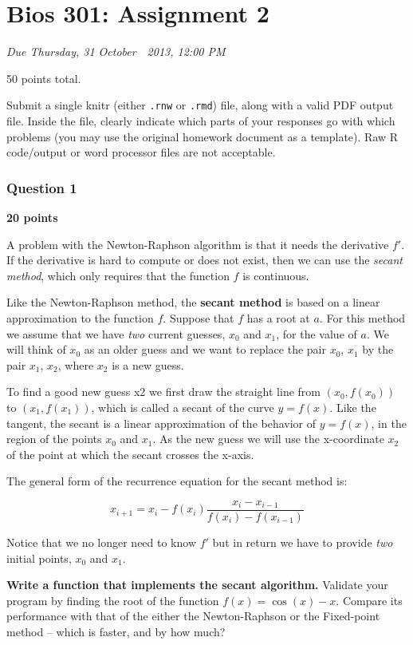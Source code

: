 \documentclass[]{article}
\author{}
\date{}
\begin{document}
\section{Bios 301: Assignment 2}

\emph{Due Thursday, 31 October 👻 2013, 12:00 PM}

50 points total.

Submit a single knitr (either \texttt{.rnw} or \texttt{.rmd}) file,
along with a valid PDF output file. Inside the file, clearly indicate
which parts of your responses go with which problems (you may use the
original homework document as a template). Raw R code/output or word
processor files are not acceptable.

\subsubsection{Question 1}

\textbf{20 points}

A problem with the Newton-Raphson algorithm is that it needs the
derivative $f′$. If the derivative is hard to compute or does not exist,
then we can use the \emph{secant method}, which only requires that the
function $f$ is continuous.

Like the Newton-Raphson method, the \textbf{secant method} is based on a
linear approximation to the function $f$. Suppose that $f$ has a root at
$a$. For this method we assume that we have \emph{two} current guesses,
$x_0$ and $x_1$, for the value of $a$. We will think of $x_0$ as an
older guess and we want to replace the pair $x_0$, $x_1$ by the pair
$x_1$, $x_2$, where $x_2$ is a new guess.

To find a good new guess x2 we first draw the straight line from
$(x_0,f(x_0))$ to $(x_1,f(x_1))$, which is called a secant of the curve
$y = f(x)$. Like the tangent, the secant is a linear approximation of
the behavior of $y = f(x)$, in the region of the points $x_0$ and $x_1$.
As the new guess we will use the x-coordinate $x_2$ of the point at
which the secant crosses the x-axis.

The general form of the recurrence equation for the secant method is:

\[x_{i+1} = x_i - f(x_i)\frac{x_i - x_{i-1}}{f(x_i) - f(x_{i-1})}\]

Notice that we no longer need to know $f′$ but in return we have to
provide \emph{two} initial points, $x_0$ and $x_1$.

\textbf{Write a function that implements the secant algorithm.} Validate
your program by finding the root of the function $f(x) = \cos(x) − x$.
Compare its performance with that of the either the Newton-Raphson or
the Fixed-point method -- which is faster, and by how much?
\end{document}
